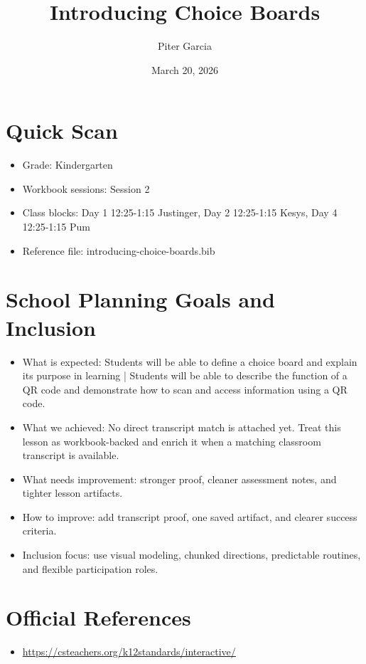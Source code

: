 \documentclass[11pt]{article}
\title{Introducing Choice Boards}
\author{Piter Garcia}
\date{March 20, 2026}
\begin{document}
\maketitle
\section*{Quick Scan}
\begin{itemize}[leftmargin=*]
\item Grade: Kindergarten
\item Workbook sessions: Session 2
\item Class blocks: Day 1 12:25-1:15 Justinger, Day 2 12:25-1:15 Kesys, Day 4 12:25-1:15 Pum
\item Reference file: introducing-choice-boards.bib
\end{itemize}
\section*{School Planning Goals and Inclusion}
\begin{itemize}[leftmargin=*]
\item What is expected: Students will be able to define a choice board and explain its purpose in learning | Students will be able to describe the function of a QR code and demonstrate how to scan and access information using a QR code.
\item What we achieved: No direct transcript match is attached yet. Treat this lesson as workbook-backed and enrich it when a matching classroom transcript is available.
\item What needs improvement: stronger proof, cleaner assessment notes, and tighter lesson artifacts.
\item How to improve: add transcript proof, one saved artifact, and clearer success criteria.
\item Inclusion focus: use visual modeling, chunked directions, predictable routines, and flexible participation roles.
\end{itemize}
\section*{Official References}
\begin{itemize}[leftmargin=*]
\item \url{https://csteachers.org/k12standards/interactive/}

\end{itemize}
\end{document}
